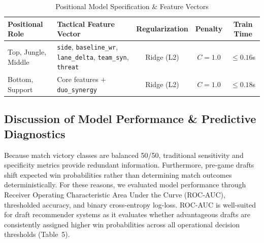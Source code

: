 \documentclass[11pt,letterpaper]{article}
\begin{document}
\vspace{-0.5em}
\begin{table}[H]
\centering
\caption{Positional Model Specification \& Feature Vectors}
\label{tab:model_char}
\footnotesize
\setlength{\tabcolsep}{5pt}
\begin{tabular}{llccc}
\toprule
\textbf{Positional Role} & \textbf{Tactical Feature Vector} & \textbf{Regularization} & \textbf{Penalty} & \textbf{Train Time} \\
\midrule
Top, Jungle, Middle & \texttt{side}, \texttt{baseline\_wr}, \texttt{lane\_delta}, \texttt{team\_syn}, \texttt{threat} & Ridge (L2) & $C=1.0$ & $\le 0.16$s \\
Bottom, Support & Core features $+$ \texttt{duo\_synergy} & Ridge (L2) & $C=1.0$ & $\le 0.18$s \\
\bottomrule
\end{tabular}
\end{table}
\vspace{-0.7em}

\subsection{Discussion of Model Performance \& Predictive Diagnostics}

Because match victory classes are balanced 50/50, traditional sensitivity and specificity metrics provide redundant information. Furthermore, pre-game drafts shift expected win probabilities rather than determining match outcomes deterministically. For these reasons, we evaluated model performance through Receiver Operating Characteristic Area Under the Curve (ROC-AUC), thresholded accuracy, and binary cross-entropy log-loss. ROC-AUC is well-suited for draft recommender systems as it evaluates whether advantageous drafts are consistently assigned higher win probabilities across all operational decision thresholds (Table~5).
\end{document}
